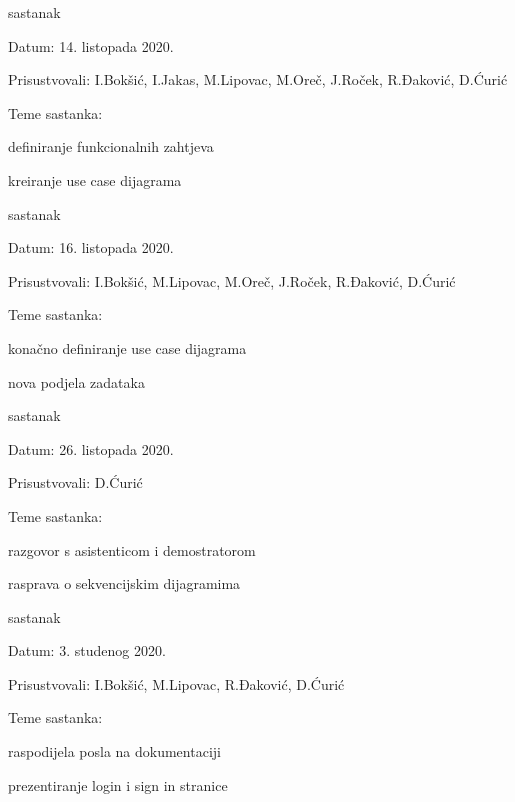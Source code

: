 \begin{packed_enum}
			
				\item  sastanak
			\item[] \begin{packed_item}
				\item Datum: 14. listopada 2020.
				\item Prisustvovali: I.Bokšić, I.Jakas, M.Lipovac, M.Oreč, J.Roček, R.Đaković, D.Ćurić
				\item Teme sastanka:
				\begin{packed_item}
					\item definiranje funkcionalnih zahtjeva 
					\item kreiranje use case dijagrama
				\end{packed_item}
			\end{packed_item}
				\item  sastanak
			\item[] \begin{packed_item}
				\item Datum: 16. listopada 2020.
				\item Prisustvovali: I.Bokšić, M.Lipovac, M.Oreč, J.Roček, R.Đaković, D.Ćurić
				\item Teme sastanka:
				\begin{packed_item}
					\item konačno definiranje use case dijagrama
					\item nova podjela zadataka
				\end{packed_item}
			\end{packed_item}
	
		\item  sastanak
		\item[] \begin{packed_item}
			\item Datum:  26. listopada 2020.
			\item Prisustvovali: D.Ćurić
			\item Teme sastanka:
			\begin{packed_item}
				\item razgovor s asistenticom i demostratorom
				\item rasprava o sekvencijskim dijagramima
			\end{packed_item}
		\end{packed_item}

			\item  sastanak
		\item[] \begin{packed_item}
			\item Datum: 3. studenog 2020.
			\item Prisustvovali: I.Bokšić, M.Lipovac, R.Đaković, D.Ćurić
			\item Teme sastanka:
			\begin{packed_item}
				\item raspodijela posla na dokumentaciji 
				\item prezentiranje login i  sign in stranice  
			\end{packed_item}
		\end{packed_item}
		

\end{packed_enum}
